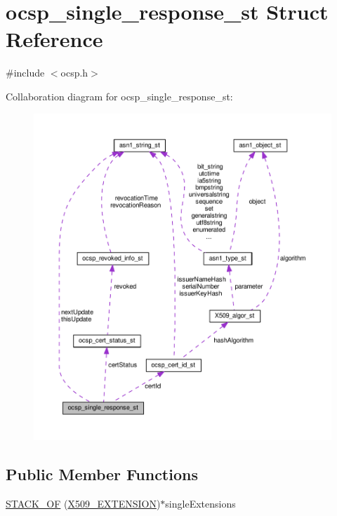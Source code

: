 \hypertarget{structocsp__single__response__st}{}\section{ocsp\+\_\+single\+\_\+response\+\_\+st Struct Reference}
\label{structocsp__single__response__st}


{\ttfamily \#include $<$ocsp.\+h$>$}



Collaboration diagram for ocsp\+\_\+single\+\_\+response\+\_\+st\+:
\nopagebreak
\begin{figure}[H]
\begin{center}
\leavevmode
\includegraphics[width=350pt]{structocsp__single__response__st__coll__graph}
\end{center}
\end{figure}
\subsection*{Public Member Functions}
\begin{DoxyCompactItemize}
\item 
\hyperlink{structocsp__single__response__st_ae3411f84f872a66b09eff966c3c77c0d}{S\+T\+A\+C\+K\+\_\+\+OF} (\hyperlink{x509_8h_ab2f7f7dc0ced8684e0cbfc818e408304}{X509\+\_\+\+E\+X\+T\+E\+N\+S\+I\+ON})$\ast$single\+Extensions
\end{DoxyCompactItemize}

